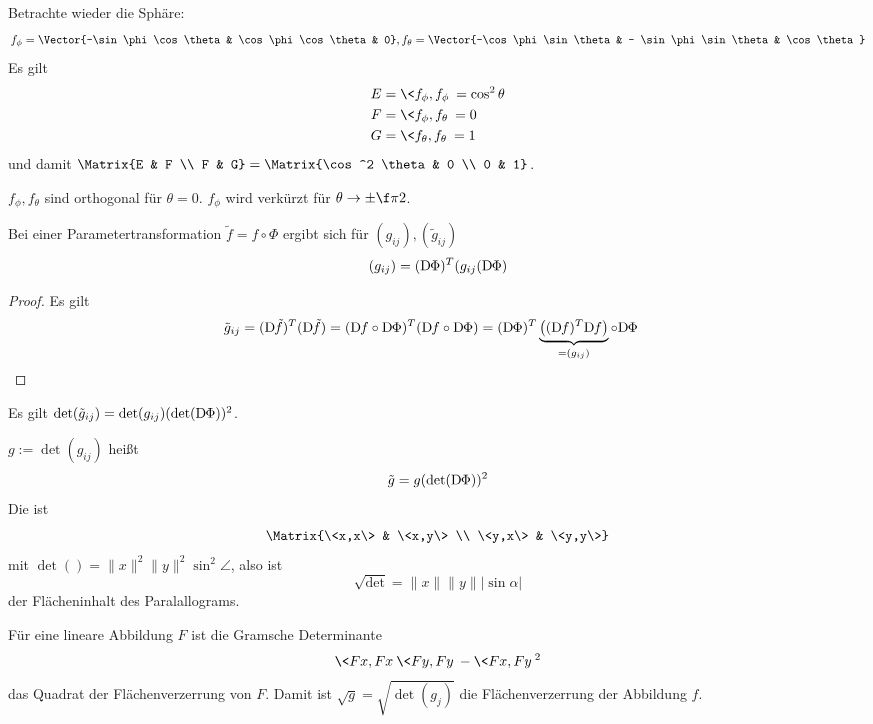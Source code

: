 \begin{ex}
	Betrachte wieder die Sphäre:
	\[
		f_\phi = \Vector{-\sin \phi \cos \theta & \cos \phi \cos \theta & 0},
		f_\theta = \Vector{-\cos \phi \sin \theta & - \sin \phi \sin \theta & \cos \theta}
	\]
	Es gilt
	\begin{align*}
		E &= \< f_\phi, f_\phi\> = \cos^2 \theta \\
		F &= \< f_\phi, f_\theta \> = 0 \\
		G &= \< f_\theta, f_\theta \> = 1
	\end{align*}
	und damit $\Matrix{E & F \\ F & G} = \Matrix{\cos^2 \theta & 0 \\ 0 & 1}$.

	$f_\phi, f_\theta$ sind orthogonal für $\theta = 0$.
	$f_\phi$ wird verkürzt für $\theta \to \pm \f \pi2$.
\end{ex}


\begin{lem}
	Bei einer Parametertransformation $\tilde f = f \circ \Phi$ ergibt sich für $(g_{ij}), (\tilde g_{ij})$
	\[
		(g_{ij}) = (\Df[\Phi])^T(g_{ij}(\Df[\Phi])
	\]
	\begin{proof}
		Es gilt
		\begin{align*}
			\tilde g_{ij} &= (\Df[\tilde f])^T (\Df[ \tilde f])
			= (\Df \circ \Df[\Phi])^T (\Df \circ \Df[\Phi])
			= (\Df[\Phi])^T \underbrace{\big((\Df)^T \Df\big)}_{=(g_{ij})} \circ \Df[\Phi]
		\end{align*}
	\end{proof}
\end{lem}

Es gilt $\det(\tilde g_{ij}) = \det(g_{ij}) (\det(\Df[\Phi]))^2$.

$g := \det(g_{ij})$ heißt 
\[
	\tilde g = g (\det(\Df[\Phi]))^2
\]
Die  ist
\[
	\Matrix{\<x,x\> & \<x,y\> \\ \<y,x\> & \<y,y\>}
\]
mit $\det() = \|x\|^2 \|y\|^2 \sin^2 \angle$, also ist
\[
	\sqrt{\det}
	= \|x\|\|y\| |\sin \alpha|
\]
der Flächeninhalt des Paralallograms.

Für eine lineare Abbildung $F$ ist die Gramsche Determinante
\[
	\<Fx, Fx\> \<Fy, Fy\> - \<Fx, Fy\>^2
\]
das Quadrat der Flächenverzerrung von $F$.
Damit ist $\sqrt{g} = \sqrt{\det(g_{j})}$ die Flächenverzerrung der Abbildung $f$.

